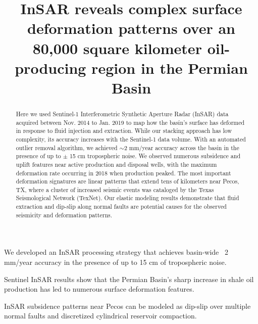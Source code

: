 \documentclass[draft]{agujournal2019}
\begin{document}
\title{InSAR reveals complex surface deformation patterns over an 80,000 square kilometer oil-producing region in the Permian Basin}




\begin{keypoints}
\item We developed an InSAR processing strategy that achieves basin-wide ~2 mm/year accuracy in the presence of up to 15 cm of tropospheric noise.
\item Sentinel InSAR results show that the Permian Basin's sharp increase in shale oil production has led to numerous surface deformation features.
\item InSAR subsidence patterns near Pecos can be modeled as dip-slip over multiple normal faults and discretized cylindrical reservoir compaction.
\end{keypoints}

\begin{abstract}
  Here we used Sentinel-1 Interferometric Synthetic Aperture Radar (InSAR) data acquired between Nov. 2014 to Jan. 2019 to map how the basin's surface has deformed in response to fluid injection and extraction. While our stacking approach has low complexity, its accuracy increases with the Sentinel-1 data volume. With an automated outlier removal algorithm, we achieved $\sim$2 mm/year accuracy across the basin in the presence of up to $\pm$ 15 cm tropospheric noise. We observed numerous subsidence and uplift features near active production and disposal wells, with the maximum deformation rate occurring in 2018 when production peaked. The most important deformation signatures are linear patterns that extend tens of kilometers near Pecos, TX, where a cluster of increased seismic events was cataloged by the Texas Seismological Network (TexNet). Our elastic modeling results demonstrate that fluid extraction and dip-slip along normal faults are potential causes for the observed seismicity and deformation patterns.

\end{abstract}
\end{document}

